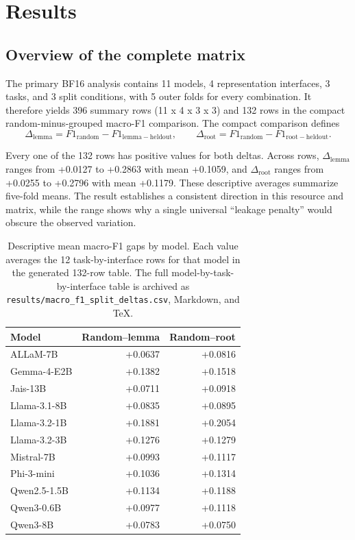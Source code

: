 \documentclass[pdflatex,sn-basic]{sn-jnl}
\begin{document}
\section{Results}

\subsection{Overview of the complete matrix}

The primary BF16 analysis contains 11 models, 4 representation interfaces, 3
tasks, and 3 split conditions, with 5 outer folds for every combination. It
therefore yields 396 summary rows (11 x 4 x 3 x 3) and 132 rows in the compact
random-minus-grouped macro-F1 comparison. The compact comparison defines
\[
\Delta_{\mathrm{lemma}} = F1_{\mathrm{random}} - F1_{\mathrm{lemma-heldout}},
\qquad
\Delta_{\mathrm{root}} = F1_{\mathrm{random}} - F1_{\mathrm{root-heldout}}.
\]

Every one of the 132 rows has positive values for both deltas. Across rows,
$\Delta_{\mathrm{lemma}}$ ranges from +0.0127 to +0.2863 with mean +0.1059,
and $\Delta_{\mathrm{root}}$ ranges from +0.0255 to +0.2796 with mean
+0.1179. These descriptive averages summarize five-fold means. The result
establishes a consistent direction in this resource and matrix, while the
range shows why a single universal ``leakage penalty'' would obscure the
observed variation.

\begin{table}[t]
\centering
\caption{Descriptive mean macro-F1 gaps by model. Each value averages the 12
task-by-interface rows for that model in the generated 132-row table. The
full model-by-task-by-interface table is archived as
\texttt{results/macro\_f1\_split\_deltas.csv}, Markdown, and TeX.}
\label{tab:model-deltas}
\small
\begin{tabular}{lrr}
\toprule
Model & Random--lemma & Random--root \\
\midrule
ALLaM-7B & +0.0637 & +0.0816 \\
Gemma-4-E2B & +0.1382 & +0.1518 \\
Jais-13B & +0.0711 & +0.0918 \\
Llama-3.1-8B & +0.0835 & +0.0895 \\
Llama-3.2-1B & +0.1881 & +0.2054 \\
Llama-3.2-3B & +0.1276 & +0.1279 \\
Mistral-7B & +0.0993 & +0.1117 \\
Phi-3-mini & +0.1036 & +0.1314 \\
Qwen2.5-1.5B & +0.1134 & +0.1188 \\
Qwen3-0.6B & +0.0977 & +0.1118 \\
Qwen3-8B & +0.0783 & +0.0750 \\
\bottomrule
\end{tabular}
\end{table}
\end{document}
